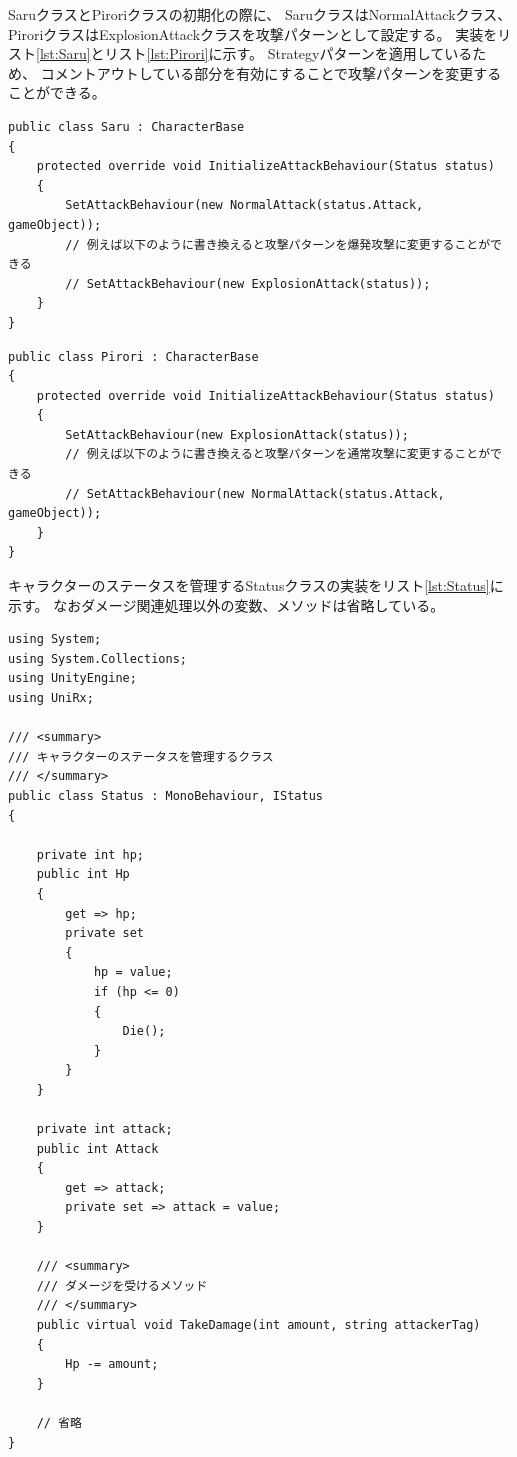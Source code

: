 \documentclass[dvipdfmx,fleqn,article]{jlreq}
\begin{document}
SaruクラスとPiroriクラスの初期化の際に、
SaruクラスはNormalAttackクラス、PiroriクラスはExplosionAttackクラスを攻撃パターンとして設定する。
実装をリスト\ref{lst:Saru}とリスト\ref{lst:Pirori}に示す。
Strategyパターンを適用しているため、
コメントアウトしている部分を有効にすることで攻撃パターンを変更することができる。
\begin{lstlisting}[language=CSharp, caption=Saruクラス, label={lst:Saru}]
public class Saru : CharacterBase
{
    protected override void InitializeAttackBehaviour(Status status)
    {
        SetAttackBehaviour(new NormalAttack(status.Attack, gameObject));
        // 例えば以下のように書き換えると攻撃パターンを爆発攻撃に変更することができる
        // SetAttackBehaviour(new ExplosionAttack(status));
    }
}
\end{lstlisting}

\begin{lstlisting}[language=CSharp, caption=Piroriクラス, label={lst:Pirori}]
public class Pirori : CharacterBase
{
    protected override void InitializeAttackBehaviour(Status status)
    {
        SetAttackBehaviour(new ExplosionAttack(status));
        // 例えば以下のように書き換えると攻撃パターンを通常攻撃に変更することができる
        // SetAttackBehaviour(new NormalAttack(status.Attack, gameObject));
    }
}
\end{lstlisting}

キャラクターのステータスを管理するStatusクラスの実装をリスト\ref{lst:Status}に示す。
なおダメージ関連処理以外の変数、メソッドは省略している。
\begin{lstlisting}[language=CSharp, caption=Statusクラス, label={lst:Status}]
using System;
using System.Collections;
using UnityEngine;
using UniRx;

/// <summary>
/// キャラクターのステータスを管理するクラス
/// </summary>
public class Status : MonoBehaviour, IStatus
{

    private int hp;
    public int Hp
    {
        get => hp;
        private set
        {
            hp = value;
            if (hp <= 0)
            {
                Die();
            }
        }
    }

    private int attack;
    public int Attack
    {
        get => attack;
        private set => attack = value;
    }

    /// <summary>
    /// ダメージを受けるメソッド
    /// </summary>
    public virtual void TakeDamage(int amount, string attackerTag)
    {
        Hp -= amount;
    }

    // 省略
}
\end{lstlisting}
\end{document}
